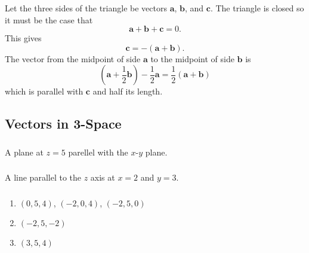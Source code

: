 \documentclass{article}
\begin{document}
\setcounter{subsubsection}{48}
\subsubsection{}

Let the three sides of the triangle be vectors $\mathbf{a}$, $\mathbf{b}$, and $\mathbf{c}$. The triangle is closed so it must be the case that \[\mathbf{a} + \mathbf{b} + \mathbf{c} = 0.\] This gives \[\mathbf{c} = -(\mathbf{a} + \mathbf{b}).\] The vector from the midpoint of side $\mathbf{a}$ to the midpoint of side $\mathbf{b}$ is \[\left( \mathbf{a} + \frac{1}{2} \mathbf{b} \right) - \frac{1}{2} \mathbf{a} = \frac{1}{2} (\mathbf{a} + \mathbf{b})\] which is parallel with $\mathbf{c}$ and half its length.

\subsection{Vectors in 3-Space}

\setcounter{subsubsection}{6}
\subsubsection{}

A plane at $z = 5$ parellel with the $x$-$y$ plane.

\setcounter{subsubsection}{8}
\subsubsection{}

A line parallel to the $z$ axis at $x = 2$ and $y = 3$.

\setcounter{subsubsection}{12}
\subsubsection{}

\begin{enumerate}
  \item $(0, 5, 4)$, $(-2, 0, 4)$, $(-2, 5, 0)$

  \item $(-2, 5, -2)$

  \item $(3, 5, 4)$
\end{enumerate}

\setcounter{subsubsection}{14}
\subsubsection{}
\end{document}
